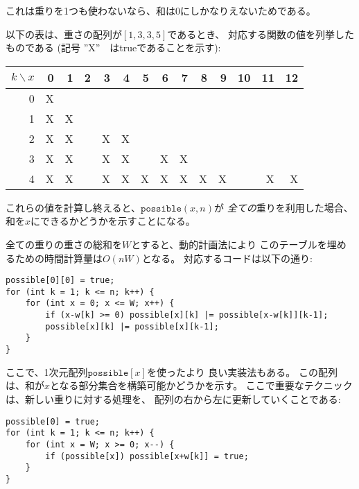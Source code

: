 これは重りを1つも使わないなら、和は0にしかなりえないためである。

以下の表は、重さの配列が$[1,3,3,5]$であるとき、
対応する関数の値を列挙したものである
(記号 ''X''　はtrueであることを示す):

\begin{center}
\begin{tabular}{r|rrrrrrrrrrrrr}
$k \backslash x$ & 0 & 1 & 2 & 3 & 4 & 5 & 6 & 7 & 8 & 9 & 10 & 11 & 12 \\
\hline
 0 & X & \\
 1 & X & X \\
 2 & X & X & & X & X \\
 3 & X & X & & X & X & & X & X \\
 4 & X & X & & X & X & X & X & X & X & X & & X & X \\
\end{tabular}
\end{center}

\begin{comment}
After calculating those values, $\texttt{possible}(x,n)$
tells us whether we can construct a
sum $x$ using \emph{all} weights.

Let $W$ denote the total sum of the weights.
The following $O(nW)$ time
dynamic programming solution
corresponds to the recursive function:
\end{comment}

これらの値を計算し終えると、$\texttt{possible}(x,n)$が
\emph{全ての}重りを利用した場合、和を$x$にできるかどうかを示すことになる。

全ての重りの重さの総和を$W$とすると、動的計画法により
このテーブルを埋めるための時間計算量は$O(nW)$となる。
対応するコードは以下の通り:
\begin{lstlisting}
possible[0][0] = true;
for (int k = 1; k <= n; k++) {
    for (int x = 0; x <= W; x++) {
        if (x-w[k] >= 0) possible[x][k] |= possible[x-w[k]][k-1];
        possible[x][k] |= possible[x][k-1];
    }
}
\end{lstlisting}

\begin{comment}
However, here is a better implementation that only uses
a one-dimensional array $\texttt{possible}[x]$
that indicates whether we can construct a subset with sum $x$.
The trick is to update the array from right to left for
each new weight:
\end{comment}

ここで、1次元配列$\texttt{possible}[x]$を使ったより
良い実装法もある。
この配列は、和が$x$となる部分集合を構築可能かどうかを示す。
ここで重要なテクニックは、新しい重りに対する処理を、
配列の右から左に更新していくことである:
\begin{lstlisting}
possible[0] = true;
for (int k = 1; k <= n; k++) {
    for (int x = W; x >= 0; x--) {
        if (possible[x]) possible[x+w[k]] = true;
    }
}
\end{lstlisting}

